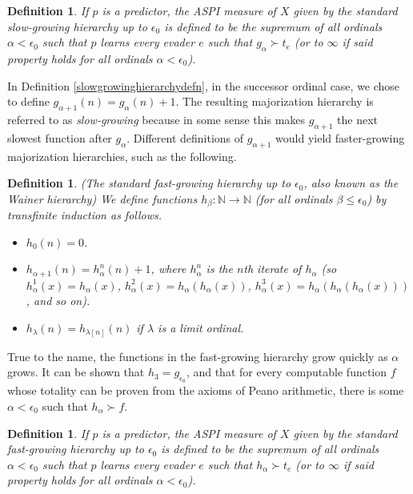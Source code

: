 \documentclass{article}
\newtheorem{definition}[theorem]{Definition}
\begin{document}
\begin{definition}
\label{tradmajorizationhierarchyhibbardmeasuredefn}
    If $p$ is a predictor, the \emph{ASPI measure of $X$ given by the
    standard slow-growing hierarchy up to $\epsilon_0$} is defined to be the
    supremum of all ordinals $\alpha<\epsilon_0$ such that
    $p$ learns every evader $e$ such that $g_\alpha\succ t_e$ (or to
    $\infty$ if said property holds for all ordinals $\alpha<\epsilon_0$).
\end{definition}

In Definition \ref{slowgrowinghierarchydefn}, in the successor ordinal case,
we chose to define $g_{\alpha+1}(n)=g_\alpha(n)+1$. The resulting majorization
hierarchy is referred to as \emph{slow-growing} because in some sense this
makes $g_{\alpha+1}$ the next slowest function after $g_\alpha$.
Different definitions of $g_{\alpha+1}$ would yield faster-growing majorization
hierarchies, such as the following.

\begin{definition}
\label{fastgrowinghierarchydefn}
    (The standard fast-growing hierarchy up to $\epsilon_0$, also known as
    the Wainer hierarchy)
    We define functions $h_\beta:\mathbb N\to\mathbb N$ (for all ordinals
    $\beta\leq \epsilon_0$) by transfinite induction as follows.
    \begin{itemize}
        \item
        $h_0(n)=0$.
        \item
        $h_{\alpha+1}(n) = h^n_\alpha(n)+1$, where $h^n_\alpha$ is the $n$th
        iterate of $h_\alpha$ (so $h^1_\alpha(x)=h_\alpha(x)$,
        $h^2_\alpha(x)=h_\alpha(h_\alpha(x))$,
        $h^3_\alpha(x)=h_\alpha(h_\alpha(h_\alpha(x)))$, and so on).
        \item
        $h_{\lambda}(n) = h_{\lambda[n]}(n)$ if $\lambda$ is a limit ordinal.
    \end{itemize}
\end{definition}

True to the name, the functions in the fast-growing hierarchy grow quickly
as $\alpha$ grows. It can be shown that $h_3=g_{\epsilon_0}$, and that
for every computable function $f$ whose totality can be proven from the axioms of
Peano arithmetic, there is some $\alpha<\epsilon_0$ such that $h_\alpha\succ f$.

\begin{definition}
\label{fastmajorizationhierarchyhibbardmeasuredefn}
    If $p$ is a predictor, the \emph{ASPI measure of $X$ given by the
    standard fast-growing hierarchy up to $\epsilon_0$} is defined to be the
    supremum of all ordinals $\alpha<\epsilon_0$ such that
    $p$ learns every evader $e$ such that $h_\alpha\succ t_e$ (or to
    $\infty$ if said property holds for all ordinals $\alpha<\epsilon_0$).
\end{definition}
\end{document}
